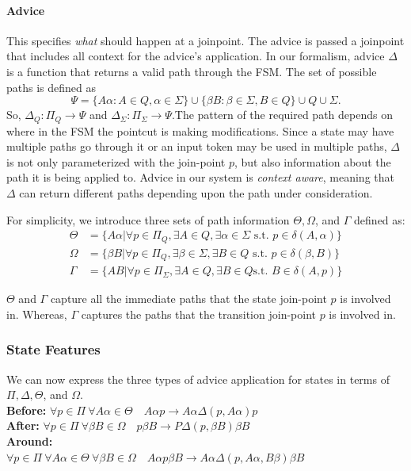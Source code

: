 \documentclass[sigplan,anonymous,review]{acmart}
\begin{document}
\paragraph{Advice} This specifies \emph{what} should happen at a joinpoint.  The advice is passed a joinpoint that includes all context for the advice's application.   In our formalism, advice $\Delta$ is a function that returns a valid path through the FSM. The set of possible paths is defined as \[\Psi = \{A\alpha: A \in Q, \alpha \in \Sigma\} \cup \{\beta B: \beta \in \Sigma, B \in Q\} \cup Q \cup \Sigma.
\] So, $\Delta_Q: \Pi_Q \rightarrow \Psi$ and $\Delta_\Sigma: \Pi_\Sigma \rightarrow \Psi$.The pattern of the required path depends on where in the FSM the pointcut is making modifications. Since a state may have multiple paths go through it or an input token may be used in multiple paths, $\Delta$ is not only parameterized with the join-point $p$, but also information about the path it is being applied to. Advice in our system is \emph{context aware}, meaning that $\Delta$ can return different paths depending upon the path under consideration. 

For simplicity, we introduce three sets of path information $\Theta, \Omega$, and $\Gamma$ defined as:
\begin{align*}
    \Theta &= \{A \alpha | \forall p \in \Pi_Q, \exists A \in Q, \exists \alpha \in \Sigma \text{ s.t. } p \in \delta(A, \alpha)\}\\
    \Omega &= \{\beta B | \forall p \in \Pi_Q, \exists \beta \in \Sigma, \exists B \in Q \text{ s.t. } p \in \delta(\beta, B)\}\\
    \Gamma &= \{AB | \forall p \in \Pi_\Sigma, \exists A \in Q, \exists B \in Q \text {s.t. } B \in \delta(A, p)\}
\end{align*}

$\Theta$ and $\Gamma$ capture all the immediate paths that the state join-point $p$ is involved in. Whereas, $\Gamma$ captures the paths that the transition join-point $p$ is involved in. 

\subsubsection{State Features}
We can now express the three types of advice application for states in terms of $\Pi, \Delta, \Theta$, and $\Omega$.\\
\textbf{Before:} $\forall p \in \Pi \ \forall A \alpha \in \Theta \quad A \alpha p \rightarrow A \alpha \Delta(p, A \alpha)p$\\
\textbf{After:} $\forall p \in \Pi \ \forall \beta B \in \Omega \quad p\beta B \rightarrow P\Delta(p, \beta B)\beta B$\\
\textbf{Around:} \\
$\forall p \in \Pi \ \forall A \alpha \in \Theta \ \forall \beta B \in \Omega \quad A \alpha p \beta B \rightarrow A \alpha \Delta(p, A \alpha, B \beta) \beta B $
\end{document}

